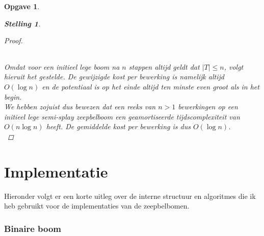 \documentclass[12pt,hidelinks]{article}
\newtheorem{opgave}{Opgave}
\newtheorem{stelling}{Stelling}
\newcommand{\newln}{~\\\vspace{0.5em}}
\begin{document}
\begin{opgave}
\begin{description}
\begin{stelling}
\begin{proof}
\begin{center}
\begin{tabular}{ l | m{3cm} | p{6cm} }
                            \end{tabular}
                        \end{center}
                        Omdat voor een initieel lege boom na $n$ stappen altijd geldt dat $|T| \le n$, volgt hieruit het gestelde.
                        De gewijzigde kost per bewerking is namelijk altijd $O(\log n)$ en de potentiaal is op het einde altijd ten minste even groot als in het begin.
                        \newln
                        We hebben zojuist dus bewezen dat een reeks van $n > 1$ bewerkingen op een initieel lege semi-splay zeepbelboom een geamortiseerde tijdscomplexiteit van $O(n \log n)$ heeft. De gemiddelde kost per bewerking is dus $O(\log n)$.\newln
                    \end{proof}
                \end{stelling}
        \end{description}
    \end{opgave}
    \newpage
    \part{Implementatie}
    Hieronder volgt er een korte uitleg over de interne structuur en algoritmes die
    ik heb gebruikt voor de implementaties van de zeepbelbomen.
    \section{Binaire boom}
\end{document}
